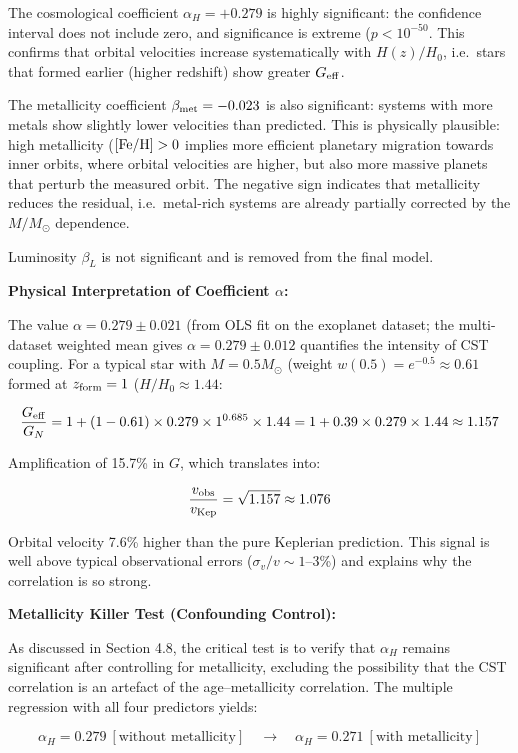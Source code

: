\documentclass[11pt,a4paper]{article}
\begin{document}
The cosmological coefficient \(\alpha_H = +0.279\) is highly
significant: the confidence interval does not include zero, and
significance is extreme (\(p < 10^{-50}\). This confirms that orbital
velocities increase systematically with \(H(z)/H_0\), i.e.~stars that
formed earlier (higher redshift) show greater \(G_{\rm eff}\).

The metallicity coefficient \(\beta_{\rm met} = -0.023\) is also
significant: systems with more metals show slightly lower velocities
than predicted. This is physically plausible: high metallicity
(\([{\rm Fe/H}] > 0\) implies more efficient planetary migration
towards inner orbits, where orbital velocities are higher, but also more
massive planets that perturb the measured orbit. The negative sign
indicates that metallicity reduces the residual, i.e.~metal-rich systems
are already partially corrected by the \(M/M_\odot\) dependence.

Luminosity \(\beta_L\) is not significant and is removed from the final
model.

\textbf{Physical Interpretation of Coefficient \(\alpha\):}

The value \(\alpha = 0.279 \pm 0.021\) (from OLS fit on the exoplanet
dataset; the multi-dataset weighted mean gives
\(\alpha = 0.279 \pm 0.012\) quantifies the intensity of CST coupling.
For a typical star with \(M = 0.5 M_\odot\) (weight
\(w(0.5) = e^{-0.5} \approx 0.61\) formed at \(z_{\rm form} = 1\)
(\(H/H_0 \approx 1.44\):

\[\frac{G_{\rm eff}}{G_N} = 1 + (1-0.61) \times 0.279 \times 1^{0.685} \times 1.44 = 1 + 0.39 \times 0.279 \times 1.44 \approx 1.157\]

Amplification of 15.7\% in \(G\), which translates into:

\[\frac{v_{\rm obs}}{v_{\rm Kep}} = \sqrt{1.157} \approx 1.076\]

Orbital velocity 7.6\% higher than the pure Keplerian prediction. This
signal is well above typical observational errors
(\(\sigma_v/v \sim 1\)--3\%) and explains why the correlation is so
strong.

\textbf{Metallicity Killer Test (Confounding Control):}

As discussed in Section 4.8, the critical test is to verify that
\(\alpha_H\) remains significant after controlling for metallicity,
excluding the possibility that the CST correlation is an artefact of the
age--metallicity correlation. The multiple regression with all four
predictors yields:

\[\alpha_H = 0.279~[\text{without metallicity}] \quad\to\quad \alpha_H = 0.271~[\text{with metallicity}]\]
\end{document}
